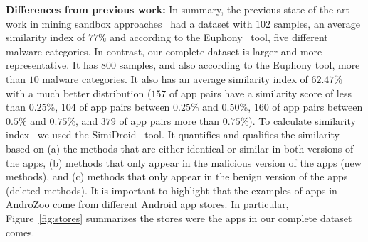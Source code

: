 \textbf{Differences from previous work: } In summary, the previous state-of-the-art work in mining sandbox approaches~\cite{DBLP:conf/wcre/BaoLL18} had a dataset with $102$ samples, an average similarity index of $77\%$ and according to the Euphony~\cite{hurier2017euphony} tool, five different malware categories. In contrast, our complete dataset is larger and more representative. It has $800$ samples, and also according to the Euphony tool, more than $10$ malware categories. 
It also has an average similarity index of $62.47\%$ with a much better distribution ($157$ of
app pairs have a similarity score of less than $0.25\%$, $104$ of app pairs between $0.25\%$ and $0.50\%$, $160$ of app pairs between $0.5\%$ and $0.75\%$, and $379$ of app pairs more than $0.75\%$). To calculate similarity index~\cite{DBLP:conf/wcre/0029BKT16} we used the SimiDroid~\cite{DBLP:conf/trustcom/0029BK17} tool. It quantifies and qualifies the similarity based on (a) the methods that are either identical or similar in both versions of the apps, (b) methods that only appear in the malicious version of the apps (new methods), and (c) methods that only appear in the benign version of the apps (deleted methods). It is important to highlight that the examples of apps in AndroZoo come from different Android app stores. In particular,
Figure~\ref{fig:stores} summarizes the stores were the apps in our complete dataset comes.  





